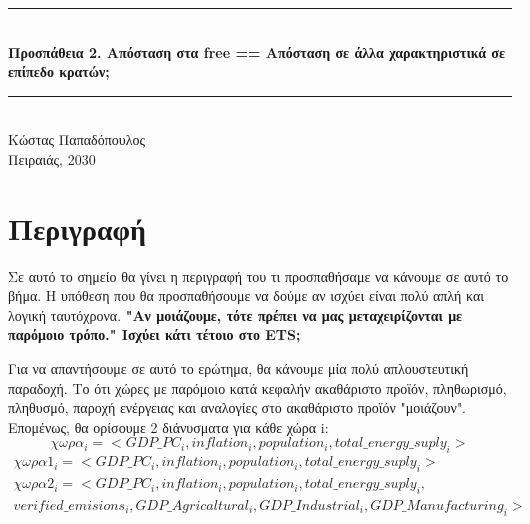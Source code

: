 \documentclass[a4paper,twoside,10pt]{article}
\begin{document}
	\begin{titlepage}
		\newcommand{\HRule}{\rule{\linewidth}{0.5mm}} %
		
		\center %
		
		
		
		
		\HRule \\[0.75cm]
		
		{ \huge \bfseries Προσπάθεια 2. Απόσταση στα free == Απόσταση σε άλλα χαρακτηριστικά σε επίπεδο κρατών;}
		\\[0.4cm] %
		\HRule \\[1cm]
		
		{ \large Κώστας Παπαδόπουλος}\\[1cm] %
		{ \large Πειραιάς, 2030}\\[1cm] %
		\tableofcontents
		
		\vfill %
	\end{titlepage}
	
	
	\section{Περιγραφή}
	Σε αυτό το σημείο θα γίνει η περιγραφή του τι προσπαθήσαμε να κάνουμε σε αυτό το βήμα. Η υπόθεση που θα προσπαθήσουμε να δούμε αν ισχύει είναι πολύ απλή και λογική ταυτόχρονα. {\bfseries "Αν μοιάζουμε, τότε πρέπει να μας μεταχειρίζονται με παρόμοιο τρόπο." Ισχύει κάτι τέτοιο στο ETS;}
	
	Για να απαντήσουμε σε αυτό το ερώτημα, θα κάνουμε μία πολύ απλουστευτική παραδοχή. Το ότι χώρες με παρόμοιο κατά κεφαλήν ακαθάριστο προϊόν, πληθωρισμό, πληθυσμό, παροχή ενέργειας και αναλογίες στο ακαθάριστο προϊόν "μοιάζουν".
	Επομένως, θα ορίσουμε 2 διάνυσματα για κάθε χώρα i:
	$$\chi \omega \rho \alpha _i = <GDP\_PC_{i}, inflation_i, population_i, total\_energy\_suply_i> 
	$$
	\begin{align*} 
		\chi \omega \rho \alpha1 _i = <GDP\_PC_{i}, inflation_i, population_i, total\_energy\_suply_i>  \\ 
		\chi \omega \rho \alpha2 _i = <GDP\_PC_{i}, inflation_i, population_i, total\_energy\_suply_i, \\
		verified\_emisions_i, GDP\_Agricaltural_i, GDP\_Industrial_i, GDP\_Manufacturing_i>
	\end{align*}
	
\end{document}
